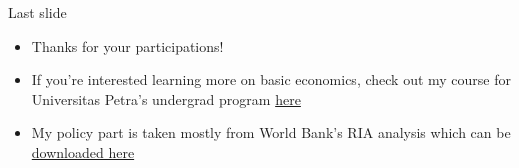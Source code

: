 \documentclass[
  ignorenonframetext,
]{beamer}
\begin{document}
\begin{frame}{Last slide}
\protect\hypertarget{last-slide}{}
\begin{itemize}
\item
  Thanks for your participations!
\item
  If you're interested learning more on basic economics, check out my
  course for Universitas Petra's undergrad program
  \href{https://www.krisna.or.id/courses/econ101/}{here}
\item
  My policy part is taken mostly from World Bank's RIA analysis which
  can be
  \href{https://www.google.com/url?sa=t\&rct=j\&q=\&esrc=s\&source=web\&cd=\&ved=2ahUKEwid5qjEvs7_AhUTXGwGHW2cAuwQFnoECA0QAQ\&url=https\%3A\%2F\%2Fdocuments1.worldbank.org\%2Fcurated\%2Fen\%2F905611520284525814\%2FGlobal-Indicators-of-Regulatory-Governance-Worldwide-Practices-of-Regulatory-Impact-Assessments.pdf\&usg=AOvVaw1iey7-rf-LV1TDlVYpYWe7\&opi=89978449}{downloaded
  here}
\end{itemize}
\end{frame}
\end{document}
